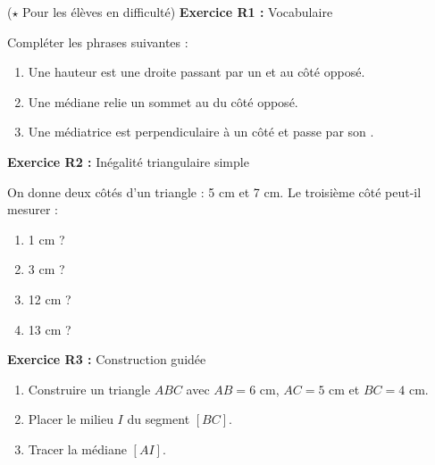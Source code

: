 \begin{exercisebox}[Remédiation] ($\star$ Pour les élèves en difficulté)
	\textbf{Exercice R1 :} Vocabulaire

	Compléter les phrases suivantes :
	\begin{enumerate}[label=\alph*)]
		\item Une hauteur est une droite passant par un  et  au côté opposé.
		\item Une médiane relie un sommet au  du côté opposé.
		\item Une médiatrice est perpendiculaire à un côté et passe par son .
	\end{enumerate}

	\medskip

	\textbf{Exercice R2 :} Inégalité triangulaire simple

	On donne deux côtés d'un triangle : 5 cm et 7 cm. Le troisième côté peut-il mesurer :
	\begin{enumerate}[label=\alph*)]
		\item 1 cm ? 
		\item 3 cm ? 
		\item 12 cm ? 
		\item 13 cm ? 
	\end{enumerate}

	\medskip

	\textbf{Exercice R3 :} Construction guidée

	\begin{enumerate}[label=\alph*)]
		\item Construire un triangle $ABC$ avec $AB = 6$ cm, $AC = 5$ cm et $BC = 4$ cm.
		\item Placer le milieu $I$ du segment $[BC]$.
		\item Tracer la médiane $[AI]$.
	\end{enumerate}
\end{exercisebox}

